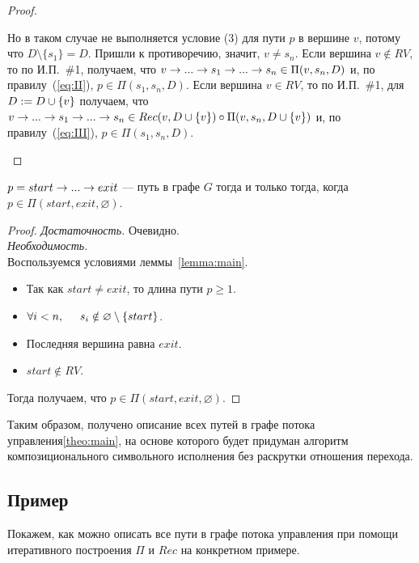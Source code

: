 \begin{proof}
\begin{itemize}
    Но в таком случае не выполняется условие (3) для пути $p$ в вершине $v$, потому что $D \setminus \{s_1\} = D$. Пришли к противоречию, значит, $v \neq s_n$.
        Если вершина $v \notin RV$, то по И.П.~\#1, получаем, что $v \rightarrow ... \rightarrow s_1 \rightarrow ... \rightarrow s_n \in \Pi(v,s_n,D)$ и, по правилу~(\ref{eq:II}),
        $p \in \Pi(s_1, s_n, D)$.
        Если вершина $v \in RV$, то по И.П.~\#1, для $D := D \cup \{v\}$ получаем, что $v \rightarrow ... \rightarrow s_1 \rightarrow ... \rightarrow s_n \in Rec(v, D \cup \{v\}) \circ \Pi(v,s_n,D \cup \{v\})$ и, по правилу~(\ref{eq:III}), $p \in \Pi(s_1,s_n,D)$.
\end{itemize}
\end{proof}

\begin{theorem}
\label{theo:main}
$p = start \rightarrow ... \rightarrow exit$ --- путь в графе $G$ тогда и только тогда, когда $p \in \Pi(start,exit,\varnothing)$. 
\end{theorem}

\begin{proof}
\emph{Достаточность.} Очевидно. \\
\emph{Необходимость.}\\
Воспользуемся условиями леммы~\ref{lemma:main}.
\begin{itemize}
    \item Так как $start \neq exit$, то длина пути $p \geq 1$.
    \item $\forall i < n, \hspace{5mm} s_i \notin \varnothing \setminus \{start\}$.
    \item Последняя вершина равна $exit$.
    \item $start \notin RV$.
\end{itemize}
Тогда получаем, что $p \in \Pi(start,exit,\varnothing)$.
\end{proof}

Таким образом, получено описание всех путей в графе потока управления\ref{theo:main}, на основе которого будет придуман алгоритм композиционального символьного исполнения без раскрутки отношения перехода.


\subsection{Пример}
Покажем, как можно описать все пути в графе потока управления при помощи итеративного построения $\Pi$ и $Rec$ на конкретном примере.

